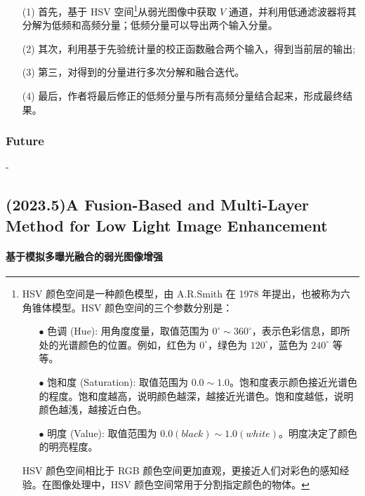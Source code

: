 \documentclass[a4paper]{ctexart}
\begin{document}
	\begin{itemize}
		\item[(1)] 
		首先，基于 HSV 空间\footnote{HSV 颜色空间是一种颜色模型，由 A.R.Smith 在 1978 年提出，也被称为六角锥体模型。HSV 颜色空间的三个参数分别是：
			\begin{itemize}
				\item[$\bullet$] 
				色调 (Hue): 用角度度量，取值范围为 $0^{\circ} \sim 360^{\circ}$，表示色彩信息，即所处的光谱颜色的位置。例如，红色为 $0^{\circ}$，绿色为 $120^{\circ}$，蓝色为 $240^{\circ}$ 等等。
				
				\item[$\bullet$]
				饱和度 (Saturation): 取值范围为 $0.0 \sim 1.0$。饱和度表示颜色接近光谱色的程度。饱和度越高，说明颜色越深，越接近光谱色。饱和度越低，说明颜色越浅，越接近白色。
				
				\item[$\bullet$]
				明度 (Value): 取值范围为 $0.0 (black) \sim 1.0 (white)$。明度决定了颜色的明亮程度。
			\end{itemize}
			
			HSV 颜色空间相比于 RGB 颜色空间更加直观，更接近人们对彩色的感知经验。在图像处理中，HSV 颜色空间常用于分割指定颜色的物体。}从弱光图像中获取 $V$ 通道，并利用低通滤波器将其分解为低频和高频分量；低频分量可以导出两个输入分量。
		
		\item[(2)]
		其次，利用基于先验统计量的校正函数融合两个输入，得到当前层的输出;
		
		\item[(3)]
		第三，对得到的分量进行多次分解和融合迭代。
		
		\item[(4)]
		最后，作者将最后修正的低频分量与所有高频分量结合起来，形成最终结果。
		
	\end{itemize}	
	
	\subsubsection{Future}
	
	-
	
	\subsection{(2023.5)A Fusion-Based and Multi-Layer Method for Low Light Image Enhancement}
	
	\paragraph{基于模拟多曝光融合的弱光图像增强}
	
\end{document}
